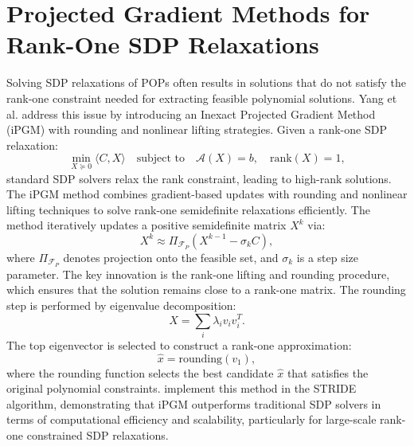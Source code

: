 \documentclass[12pt]{l4dc2021}
\begin{document}
\section{Projected Gradient Methods for Rank-One SDP Relaxations}  \label{sec:ipgm}
        Solving SDP relaxations of POPs often results in solutions that do not satisfy the rank-one constraint needed for extracting feasible polynomial solutions. Yang et al. address this issue by introducing an Inexact Projected Gradient Method (iPGM) with rounding and nonlinear lifting strategies. Given a rank-one SDP relaxation:
        \begin{equation}
            \min_{X \succeq 0} \langle C, X \rangle \quad \text{subject to} \quad \mathcal{A}(X) = b, \quad \text{rank}(X) = 1,
        \end{equation}
        standard SDP solvers relax the rank constraint, leading to high-rank solutions. The iPGM method combines gradient-based updates with rounding and nonlinear lifting techniques to solve rank-one semidefinite relaxations efficiently. The method iteratively updates a positive semidefinite matrix \( X^k \) via:
        \begin{equation} \label{eq:psd_matrix_update}
            X^{k} \approx \Pi_{\mathcal{F}_P} \left( X^{k-1} - \sigma_k C \right),
        \end{equation}
        where \( \Pi_{\mathcal{F}_P} \) denotes projection onto the feasible set, and \( \sigma_k \) is a step size parameter. The key innovation is the rank-one lifting and rounding procedure, which ensures that the solution remains close to a rank-one matrix. The rounding step is performed by eigenvalue decomposition:
        \begin{equation}
            X = \sum_{i} \lambda_i v_i v_i^T.
        \end{equation}
        The top eigenvector is selected to construct a rank-one approximation:
        \begin{equation}
            \hat{x} = \text{rounding}(v_1),
        \end{equation}
        where the rounding function selects the best candidate \( \hat{x} \) that satisfies the original polynomial constraints. \cite{yang2021inexact} implement this method in the STRIDE algorithm, demonstrating that iPGM outperforms traditional SDP solvers in terms of computational efficiency and scalability, particularly for large-scale rank-one constrained SDP relaxations.
\end{document}
